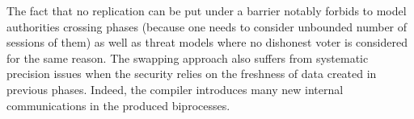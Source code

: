 %
%
%
%
The fact that no replication can be put under a barrier notably forbids to model authorities crossing phases
(because one needs to consider unbounded number of sessions of them) as well as threat models
where no dishonest voter is considered for the same reason. %
The swapping approach also suffers from systematic precision issues when the security relies on the freshness of data created in previous phases.
Indeed, the compiler introduces many new internal communications in the produced biprocesses. %
